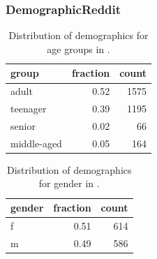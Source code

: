 \subsubsection{DemographicReddit}

\begin{table}[h]
    \centering
    \begin{tabular}{lrr}
    \toprule
    group & fraction & count \\
    \midrule
    adult & 0.52 & 1575 \\
    teenager & 0.39 & 1195 \\
    senior & 0.02 & 66 \\
    middle-aged & 0.05 & 164 \\
    \bottomrule
    \end{tabular}
    \caption{Distribution of demographics for age groups in \DSagefixed{}.}
    \label{tab:demographics:age_dist}
\end{table}

\begin{table}[]
    \centering
    \begin{tabular}{lrr}
    \toprule
    gender & fraction & count \\
    \midrule
    f & 0.51 & 614 \\
    m & 0.49 & 586 \\
    \bottomrule
    \end{tabular}
    \caption{Distribution of demographics for gender in \DSgenderfixed{}.}
    \label{tab:demographics:gender_dist}
\end{table}


